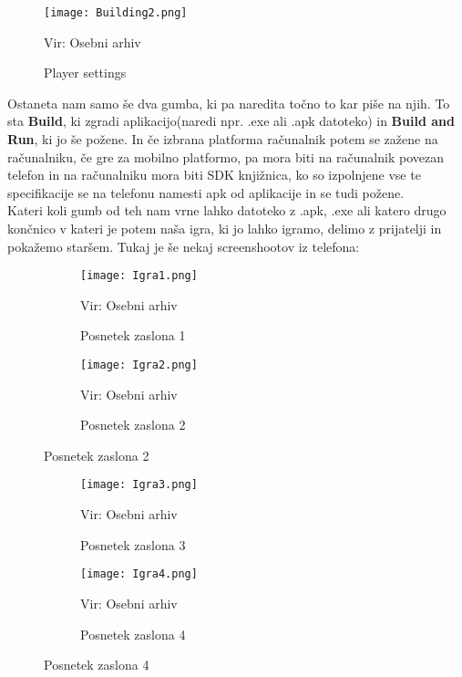 \begin{figure}[ht!]
	\centering
	\texttt{[image: Building2.png]}
	\caption{Player settings}
	{\tiny Vir: Osebni arhiv}
\end{figure}
Ostaneta nam samo še dva gumba, ki pa naredita točno to kar piše na njih. To sta \textbf{Build}, ki zgradi aplikacijo(naredi npr. .exe ali .apk datoteko) in \textbf{Build and Run}, ki jo še požene. In če izbrana platforma računalnik potem se zažene na računalniku, če gre za mobilno platformo, pa mora biti na računalnik povezan telefon in na računalniku mora biti SDK knjižnica, ko so izpolnjene vse te specifikacije se na telefonu namesti apk od aplikacije in se tudi požene.\\
Kateri koli gumb od teh nam vrne lahko datoteko z .apk, .exe ali katero drugo končnico v kateri je potem naša igra, ki jo lahko igramo, delimo z prijatelji in pokažemo staršem. Tukaj je še nekaj screenshootov iz telefona:\\
\begin{figure}[ht!]
	\centering
	\begin{subfigure}{.4\textwidth}
		\texttt{[image: Igra1.png]}
		\caption{Posnetek zaslona 1}
		{\tiny Vir: Osebni arhiv}
		\end{subfigure}
	\begin{subfigure}{.4\textwidth}
		\texttt{[image: Igra2.png]}
		\caption{Posnetek zaslona 2}
		{\tiny Vir: Osebni arhiv}
	\end{subfigure}
\end{figure}
\begin{figure}[ht!]
	\begin{subfigure}{.5\textwidth}
		\texttt{[image: Igra3.png]}
		\caption{Posnetek zaslona 3}
		{\tiny Vir: Osebni arhiv}
	\end{subfigure}
		\begin{subfigure}{.5\textwidth}
		\texttt{[image: Igra4.png]}
		\caption{Posnetek zaslona 4}
		{\tiny Vir: Osebni arhiv}
	\end{subfigure}
\end{figure}